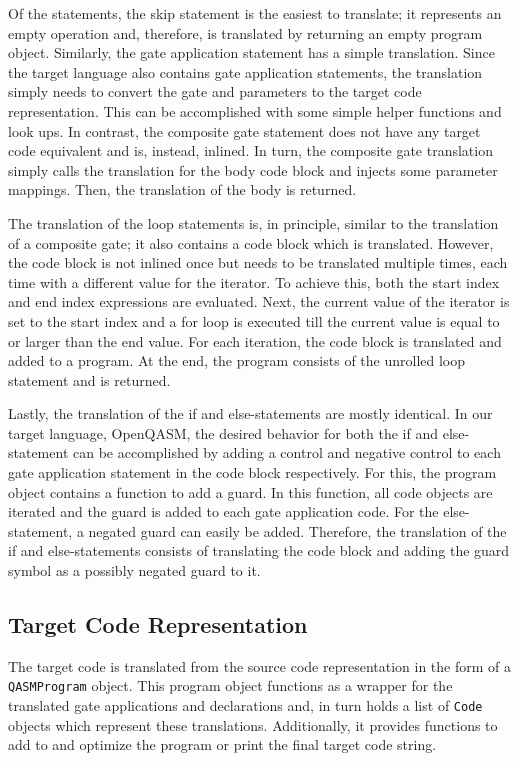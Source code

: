 Of the statements, the skip statement is the easiest to translate; it represents an empty operation and, therefore, is translated by returning an empty program object. Similarly, the gate application statement has a simple translation. Since the target language also contains gate application statements, the translation simply needs to convert the gate and parameters to the target code representation. This can be accomplished with some simple helper functions and look ups. In contrast, the composite gate statement does not have any target code equivalent and is, instead, inlined. In turn, the composite gate translation simply calls the translation for the body code block and injects some parameter mappings. Then, the translation of the body is returned.

The translation of the loop statements is, in principle, similar to the translation of a composite gate; it also contains a code block which is translated. However, the code block is not inlined once but needs to be translated multiple times, each time with a different value for the iterator. To achieve this, both the start index and end index expressions are evaluated. Next, the current value of the iterator is set to the start index and a for loop is executed till the current value is equal to or larger than the end value. For each iteration, the code block is translated and added to a program. At the end, the program consists of the unrolled loop statement and is returned. 

Lastly, the translation of the if and else-statements are mostly identical. In our target language, OpenQASM, the desired behavior for both the if and else-statement can be accomplished by adding a control and negative control to each gate application statement in the code block respectively. For this, the program object contains a function to add a guard. In this function, all code objects are iterated and the guard is added to each gate application code. For the else-statement, a negated guard can easily be added. Therefore, the translation of the if and else-statements consists of translating the code block and adding the guard symbol as a possibly negated guard to it. 

\subsection{Target Code Representation}
\label{sec:implementation_targetCode}
The target code is translated from the source code representation in the form of a \texttt{QASMProgram} object. This program object functions as a wrapper for the translated gate applications and declarations and, in turn holds a list of \texttt{Code} objects which represent these translations. Additionally, it provides functions to add to and optimize the program or print the final target code string. 

